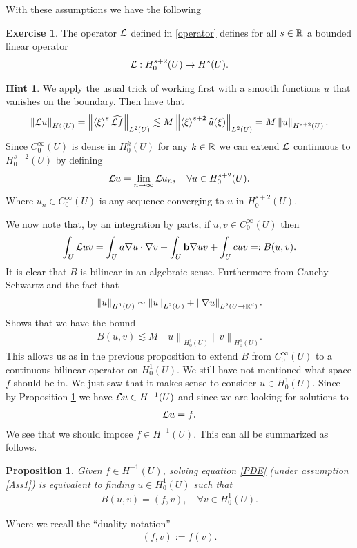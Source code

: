 \documentclass[12pt]{article}
\newtheorem{proposition}[theorem]{Proposition}
\theoremstyle{definition}
\newtheorem{exercise}{Exercise}
\newtheorem*{hint}{Hint}
\newcommand{\br}[1]{\left\langle#1\right\rangle} \newcommand{\set}[1]{\left\{#1\right\}} \newcommand{\qp}[1]{\left(#1\right)}\newcommand{\qb}[1]{\left[#1\right]}
\renewcommand{\norm}[1]{\left\lVert #1 \right\rVert}\renewcommand{\abs}[1]{\left| #1 \right|}
\begin{document}
With these assumptions we have the following
\begin{exercise}\label{domain L}
  The operator $\mathcal{L}$ defined in \eqref{operator} defines for all $s \in \mathbb{R}$ a bounded linear operator
  \begin{align*}
    \mathcal{L} : H_0^{s+2}(U)\to H^s (U).
  \end{align*}
\end{exercise}
\begin{hint}
  We apply the usual trick of working first with a smooth functions $u$ that vanishes on the boundary. Then have that
  \begin{align*}
    \norm{\Ll u}_{H^s_0(U)}=\norm{\br{\xi }^s \wh{\Ll f}}_{L^2(U)}\lesssim  M \norm{\br{\xi }^{s+2}\wh{u}(\xi )}_{L^2(U)} =M \norm{u}_{H^{s+2}(U)} .
  \end{align*}
  Since $C_0^\infty(U)$ is dense in $H^k_0(U)$ for any $k \in \mathbb{R}$ we can extend $\mathcal{L}$ continuous to $H_0^{s+2}(U)$ by defining
  \begin{align*}
    \mathcal{L} u = \lim_{n \to \infty}\mathcal{L} u_n , \quad\forall u \in  H_0^{s+2}(U).
  \end{align*}
  Where $u_n \in C_0^\infty(U)$ is any sequence converging to $u$ in  $H_0^{s+2}(U)$.
\end{hint}
We now note that, by an integration by parts, if $u,v \in  C_0^\infty(U)$ then \begin{align*}
  \int_{U} \mathcal{L} u v =\int_{U}a \nabla u \cdot \nabla v + \int_{U} \vb{b} \nabla  u v + \int_{U} cuv=: B(u,v)   .
\end{align*}
It is clear that $B$ is bilinear in an algebraic sense. Furthermore from Cauchy Schwartz and  the fact that
\begin{align*}
  \norm{u}_{H^1(U)}\sim \norm{u}_{L^2(U)}+\norm{\nabla u}_{L^2(U\to \R^d)}.
\end{align*}
Shows that we have the bound
\begin{align}\label{cont B}
  B(u,v)\lesssim M \norm{u}_{H_0^1(U)}\norm{v}_{H_0^1(U)}.
\end{align}
This allows us as in the previous proposition to extend $B$ from $C_0^\infty(U)$ to a continuous bilinear operator on  $H^1_0(U)$. We still have not mentioned what space $f$ should be in. We just saw that it makes sense to consider $u \in  H_0^1(U)$. Since by Proposition \ref{domain L} we have $\mathcal{L} u \in H^{-1}(U)$ and since we are looking for solutions to
\begin{align*}
  \mathcal{L} u=f.
\end{align*}
We see that we should impose $f \in H^{-1}(U)$. This can all be summarized as follows.
\begin{proposition}
  Given $f \in  H^{-1}(U)$, solving equation \eqref{PDE} (under assumption \ref{Ass1}) is equivalent to finding $u \in H_0^1(U)$ such that
  \begin{align}\label{reform}
    B(u,v)= (f,v) , \quad\forall v \in  H^{1}_0(U).
  \end{align}
\end{proposition}
Where we recall the ``duality notation''
\begin{align*}
  (f,v):= f(v) .
\end{align*}
\end{document}
